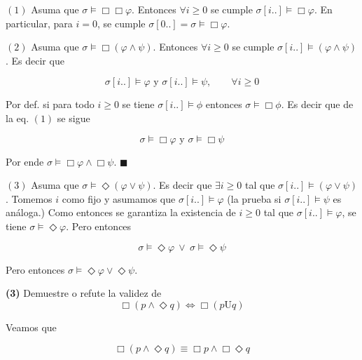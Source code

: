 \documentclass[a4paper, 12pt]{article}
\begin{document}
$(1)$ Asuma que $\sigma \vDash \Box \Box \varphi$. Entonces $\forall i \geq 0$
se cumple $\sigma[i..] \vDash \Box \varphi$. En particular, para $i = 0$, se
cumple $\sigma[0..] = \sigma \vDash \Box \varphi$. 


$(2)$ Asuma que $\sigma \vDash \Box (\varphi \land \psi)$. Entonces $\forall  i \geq 0$ se
cumple $\sigma[i..] \vDash (\varphi \land \psi)$. Es decir que 


\begin{equation}
    \sigma[i..] \vDash \varphi \text{ y } \sigma[i..] \vDash \psi, \qquad
    \forall  i \geq 0
\end{equation}

Por def. si para todo $i \geq 0$ se tiene $\sigma[i..] \vDash \phi$ entonces
$\sigma \vDash \Box \phi$. Es decir que de la eq. $(1)$  se sigue 

\begin{equation*}
    \sigma \vDash \Box \varphi \text{ y } \sigma \vDash \Box \psi
\end{equation*}

Por ende $\sigma \vDash \Box  \varphi \land  \Box  \psi$. $\blacksquare$

$(3)$ Asuma que $\sigma \vDash \Diamond (\varphi \lor \psi)$. Es decir que
$\exists  i \geq 0$ tal que $\sigma[i..] \vDash (\varphi \lor  \psi)$. Tomemos $i$
como fijo y asumamos que $\sigma[i..] \vDash \varphi$ (la prueba si $\sigma[i..]
\vDash \psi$ es análoga.) Como entonces se garantiza la existencia de $i \geq 0$
tal que $\sigma[i..] \vDash \varphi$, se tiene $\sigma \vDash \Diamond \varphi$.
Pero entonces 

\begin{equation*}
\sigma \vDash \Diamond \varphi ~ \lor ~ \sigma \vDash \Diamond  \psi
\end{equation*}

Pero entonces $\sigma \vDash \Diamond \varphi \lor \Diamond \psi $.

\pagebreak 


\begin{myframe}
    \textbf{(3)} Demuestre o refute la validez de 
    \begin{equation*}
        \Box (p \land  \Diamond  q) \iff \Box (p \text{U} q)
    \end{equation*}
\end{myframe}

Veamos que 

\begin{equation*}
    \Box (p \land \Diamond q) \equiv \Box p \land  \Box \Diamond q
\end{equation*}
\end{document}
